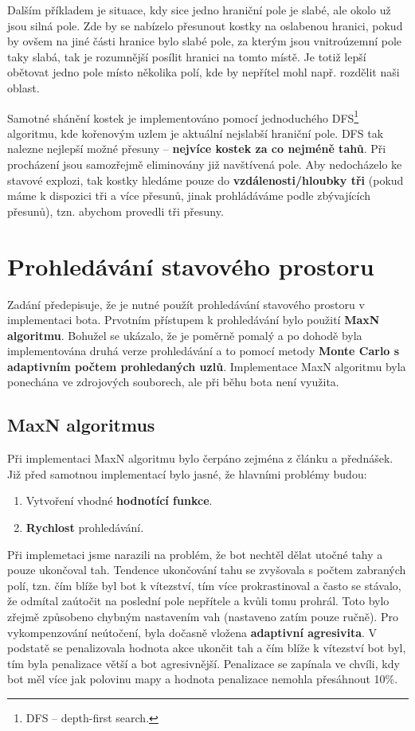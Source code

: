 \documentclass[12pt]{article}
\begin{document}
Dalším příkladem je situace, kdy sice jedno hraniční pole je slabé, ale okolo už jsou silná pole. Zde by se nabízelo přesunout kostky na oslabenou hranici, pokud by ovšem na jiné části hranice bylo slabé pole, za kterým jsou vnitroúzemní pole taky slabá, tak je rozumnější posílit hranici na tomto místě. Je totiž lepší obětovat jedno pole místo několika polí, kde by nepřítel mohl např. rozdělit naši oblast.

Samotné shánění kostek je implementováno pomocí jednoduchého DFS\footnote{DFS -- depth-first search.} algoritmu, kde kořenovým uzlem je aktuální nejslabší hraniční pole. DFS tak nalezne nejlepší možné přesuny -- \textbf{nejvíce kostek za co nejméně tahů}. Při procházení jsou samozřejmě eliminovány již navštívená pole. Aby nedocházelo ke stavové explozi, tak kostky hledáme pouze do \textbf{vzdálenosti/hloubky tři} (pokud máme k dispozici tři a více přesunů, jinak prohládáváme podle zbývajících přesunů), tzn. abychom provedli tři přesuny.


\section{Prohledávání stavového prostoru}
Zadání předepisuje, že je nutné použít prohledávání stavového prostoru v implementaci bota. Prvotním přístupem k prohledávání bylo použití \textbf{MaxN algoritmu}. Bohužel se ukázalo, že je poměrně pomalý a po dohodě byla implementována druhá verze prohledávání a to pomocí metody \textbf{Monte Carlo s adaptivním počtem prohledaných uzlů}. Implementace MaxN algoritmu byla ponechána ve zdrojových souborech, ale při běhu bota není využita.

\subsection{MaxN algoritmus}
\label{maxn}
Při implementaci MaxN algoritmu bylo čerpáno zejména z článku \cite{maxn} a přednášek. Již před samotnou implementací bylo jasné, že hlavními problémy budou:
\begin{enumerate}
    \item Vytvoření vhodné \textbf{hodnotící funkce}.
    \item \textbf{Rychlost} prohledávání.
\end{enumerate}

Při implemetaci jsme narazili na problém, že bot nechtěl dělat utočné tahy a pouze ukončoval tah. Tendence ukončování tahu se zvyšovala s počtem zabraných polí, tzn. čím blíže byl bot k vítezství, tím více prokrastinoval a často se stávalo, že odmítal zaútočit na poslední pole nepřítele a kvůli tomu prohrál. Toto bylo zřejmě způsobeno chybným nastavením vah (nastaveno zatím pouze ručně). Pro vykompenzování neútočení, byla dočasně vložena \textbf{adaptivní agresivita}. V podstatě se penalizovala hodnota akce ukončit tah a čím blíže k vítezství bot byl, tím byla penalizace větší a bot agresivnější. Penalizace se zapínala ve chvíli, kdy bot měl více jak polovinu mapy a hodnota penalizace nemohla přesáhnout 10\%.
\end{document}
